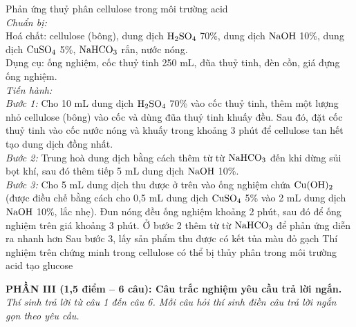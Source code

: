 \documentclass[12pt,a4paper]{article}
\providecommand{\False}{}
\begin{document}
\begin{ex}
Phản ứng thuỷ phân cellulose trong môi trường acid\\
\textit{Chuẩn bị:}\\
Hoá chất: cellulose (bông), dung dịch $\ce{H2SO4}$ 70\%, dung dịch $\ce{NaOH}$ 10\%, dung dịch $\ce{CuSO4}$ 5\%, $\ce{NaHCO3}$ rắn, nước nóng.\\
Dụng cụ: ống nghiệm, cốc thuỷ tinh 250 mL, đũa thuỷ tinh, đèn cồn, giá đựng ống nghiệm.\\
\textit{Tiến hành:}\\
\textit{Bước 1:} Cho 10 mL dung dịch $\ce{H2SO4}$ 70\% vào cốc thuỷ tinh, thêm một lượng nhỏ cellulose (bông) vào cốc và dùng đũa thuỷ tinh khuấy đều. Sau đó, đặt cốc thuỷ tinh vào cốc nước nóng và khuấy trong khoảng 3 phút để cellulose tan hết tạo dung dịch đồng nhất.\\
\textit{Bước 2:} Trung hoà dung dịch bằng cách thêm từ từ $\ce{NaHCO3}$ đến khi dừng sủi bọt khí, sau đó thêm tiếp 5 mL dung dịch $\ce{NaOH}$ 10\%.\\
\textit{Bước 3:} Cho 5 mL dung dịch thu được ở trên vào ống nghiệm chứa $\ce{Cu(OH)2}$ (được điều chế bằng cách cho 0,5 mL dung dịch $\ce{CuSO4}$ 5\% vào 2 mL dung dịch $\ce{NaOH}$ 10\%, lắc nhẹ). Đun nóng đều ống nghiệm khoảng 2 phút, sau đó để ống nghiệm trên giá khoảng 3 phút.
\choiceTF[t]
{\False Sau bước 1, sản phẩm thu được có glucose}
{\False Ở bước 2 thêm từ từ $\ce{NaHCO3}$ để phản ứng diễn ra nhanh hơn}
{\True Sau bước 3, lấy sản phẩm thu được có kết tủa màu đỏ gạch}
{\True Thí nghiệm trên chứng minh trong cellulose có thể bị thủy phân trong môi trường acid tạo glucose}
\end{ex}

\vspace{0.15cm}
\noindent
\textbf{PHẦN III (1,5 điểm -- 6 câu): Câu trắc nghiệm yêu cầu trả lời ngắn.}\\
\textit{Thí sinh trả lời từ câu 1 đến câu 6. Mỗi câu hỏi thí sinh điền câu trả lời ngắn gọn theo yêu cầu.}
\end{document}

